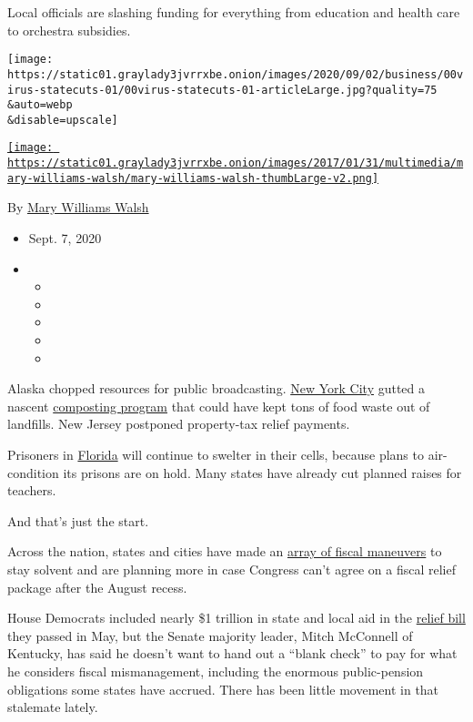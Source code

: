 Local officials are slashing funding for everything from education and
health care to orchestra subsidies.

\texttt{[image: https://static01.graylady3jvrrxbe.onion/images/2020/09/02/business/00virus-statecuts-01/00virus-statecuts-01-articleLarge.jpg?quality=75\\\&auto=webp\\\&disable=upscale]}

\href{https://www.nytimes3xbfgragh.onion/by/mary-williams-walsh}{\texttt{[image: https://static01.graylady3jvrrxbe.onion/images/2017/01/31/multimedia/mary-williams-walsh/mary-williams-walsh-thumbLarge-v2.png]}}

By \href{https://www.nytimes3xbfgragh.onion/by/mary-williams-walsh}{Mary
Williams Walsh}

\begin{itemize}
\item
  Sept. 7, 2020
\item
  \begin{itemize}
  \item
  \item
  \item
  \item
  \item
  \end{itemize}
\end{itemize}

Alaska chopped resources for public broadcasting.
\href{https://www1.nyc.gov/assets/dsny/site/services/food-scraps-and-yard-waste-page/overview-residents-organics}{New
York City} gutted a nascent
\href{https://www1.nyc.gov/assets/dsny/site/services/food-scraps-and-yard-waste-page/overview-residents-organics}{composting
program} that could have kept tons of food waste out of landfills. New
Jersey postponed property-tax relief payments.

Prisoners in
\href{https://www.tampabay.com/news/health/2020/07/02/desantis-cuts-money-for-prison-updates-hepatitis-c-treatment/}{Florida}
will continue to swelter in their cells, because plans to air-condition
its prisons are on hold. Many states have already cut planned raises for
teachers.

And that's just the start.

Across the nation, states and cities have made an
\href{https://www.nytimes3xbfgragh.onion/2020/05/14/business/virus-state-budgets.html}{array
of fiscal maneuvers} to stay solvent and are planning more in case
Congress can't agree on a fiscal relief package after the August recess.

House Democrats included nearly \$1 trillion in state and local aid in
the
\href{https://www.congress.gov/116/bills/hr6800/BILLS-116hr6800ih.pdf}{relief
bill} they passed in May, but the Senate majority leader, Mitch
McConnell of Kentucky, has said he doesn't want to hand out a ``blank
check'' to pay for what he considers fiscal mismanagement, including the
enormous public-pension obligations some states have accrued. There has
been little movement in that stalemate lately.

